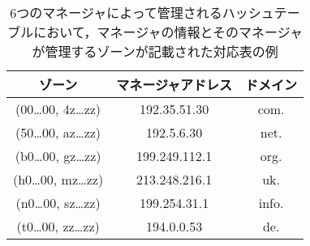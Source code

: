 \begin{table}[htb]
 \centering
  \begin{tabular}{ccc}
    \toprule
    \textbf{ゾーン} & \textbf{マネージャアドレス} & \textbf{ドメイン} \\
    \midrule
    (00…00, 4z…zz) & 192.35.51.30 & com.  \\
    (50…00, az…zz) & 192.5.6.30 & net. \\
    (b0…00, gz…zz) & 199.249.112.1 & org. \\
    (h0…00, mz…zz) & 213.248.216.1 & uk. \\
    (n0…00, sz…zz) & 199.254.31.1 & info. \\
    (t0…00, zz…zz) & 194.0.0.53 & de. \\
    \bottomrule
  \end{tabular}
 \caption{6つのマネージャによって管理されるハッシュテーブルにおいて，マネージャの情報とそのマネージャが管理するゾーンが記載された対応表の例}
 \label{tab:hash-management}
\end{table}

